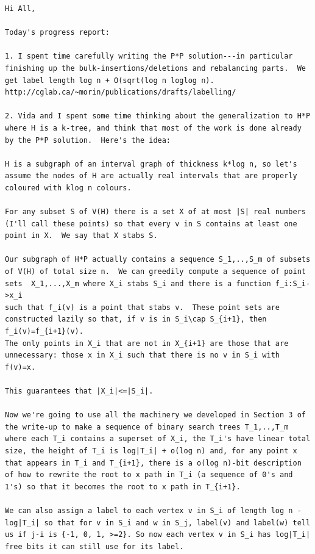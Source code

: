 \documentclass[kpfonts]{patmorin}
\begin{document}
\begin{verbatim}
Hi All,

Today's progress report:

1. I spent time carefully writing the P*P solution---in particular
finishing up the bulk-insertions/deletions and rebalancing parts.  We
get label length log n + O(sqrt(log n loglog n).
http://cglab.ca/~morin/publications/drafts/labelling/

2. Vida and I spent some time thinking about the generalization to H*P
where H is a k-tree, and think that most of the work is done already
by the P*P solution.  Here's the idea:

H is a subgraph of an interval graph of thickness k*log n, so let's
assume the nodes of H are actually real intervals that are properly
coloured with klog n colours.

For any subset S of V(H) there is a set X of at most |S| real numbers
(I'll call these points) so that every v in S contains at least one
point in X.  We say that X stabs S.

Our subgraph of H*P actually contains a sequence S_1,..,S_m of subsets
of V(H) of total size n.  We can greedily compute a sequence of point
sets  X_1,...,X_m where X_i stabs S_i and there is a function f_i:S_i->x_i
such that f_i(v) is a point that stabs v.  These point sets are
constructed lazily so that, if v is in S_i\cap S_{i+1}, then f_i(v)=f_{i+1}(v). 
The only points in X_i that are not in X_{i+1} are those that are unnecessary: those x in X_i such that there is no v in S_i with f(v)=x.

This guarantees that |X_i|<=|S_i|.

Now we're going to use all the machinery we developed in Section 3 of
the write-up to make a sequence of binary search trees T_1,..,T_m
where each T_i contains a superset of X_i, the T_i's have linear total
size, the height of T_i is log|T_i| + o(log n) and, for any point x
that appears in T_i and T_{i+1}, there is a o(log n)-bit description
of how to rewrite the root to x path in T_i (a sequence of 0's and
1's) so that it becomes the root to x path in T_{i+1}.

We can also assign a label to each vertex v in S_i of length log n -
log|T_i| so that for v in S_i and w in S_j, label(v) and label(w) tell
us if j-i is {-1, 0, 1, >=2}. So now each vertex v in S_i has log|T_i|
free bits it can still use for its label.


\end{verbatim}
\end{document}
